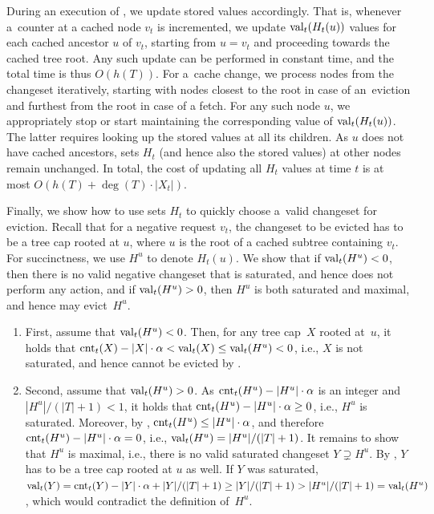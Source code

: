 During an execution of \ALGTC, we update stored values accordingly.
That is, whenever a~counter at a cached node $v_t$ is incremented, we update
$\textrm{val}_t(H_t(u))$ values for each cached ancestor $u$ of $v_t$, starting from
\mbox{$u = v_t$} and proceeding towards the cached tree root. Any such update can be
performed in constant time, and the total time is thus $O(h(T))$. For a~cache
change, we process nodes from the changeset iteratively, starting with nodes
closest to the root in case of an~eviction and furthest from the root in case
of a fetch. For any such node $u$, we appropriately stop or start maintaining
the corresponding value of $\textrm{val}_t(H_t(u))$. The latter requires looking up the
stored values at all its children. As $u$ does not have cached
ancestors, sets $H_t$ (and hence also the stored values) at other nodes 
remain unchanged. In total, the
cost of updating all $H_t$ values at time $t$ is at most $O(h(T) + \deg(T)
\cdot |X_t|)$.

Finally, we show how to use sets $H_t$ to quickly choose a~valid changeset for
eviction. Recall that for a negative request $v_t$, the changeset to be
evicted has to be a tree cap rooted at $u$, where $u$ is the root of a cached subtree
containing $v_t$. For succinctness, we use $H^u$ to denote $H_t(u)$. We show
that if $\textrm{val}_t(H^u) < 0$, then there is no valid negative changeset that is
saturated, and hence \ALGTC does not perform any action, and if $\textrm{val}_t(H^u) >
0$, then $H^u$ is both saturated and maximal, and hence \ALGTC may evict~$H^u$.

\begin{enumerate} 
\item First, assume that $\textrm{val}_t(H^u) < 0$. Then, for any tree cap~$X$ rooted
at~$u$, it holds that $\textrm{cnt}_t(X) - |X| \cdot \alpha < \textrm{val}_t(X) \leq
\textrm{val}_t(H^u) < 0$, i.e., $X$ is not saturated, and hence cannot be evicted by
\ALGTC.

\item Second, assume that $\textrm{val}_t(H^u) > 0$. As $\textrm{cnt}_t(H^u) - |H^u| \cdot
\alpha$ is an integer and $|H^u|/(|T|+1) < 1$, it holds that $\textrm{cnt}_t(H^u) -
|H^u| \cdot \alpha \geq 0$, i.e., $H^u$ is saturated. Moreover, by
, $\textrm{cnt}_t(H^u) \leq |H^u| \cdot
\alpha$, and therefore $\textrm{cnt}_t(H^u) - |H^u| \cdot \alpha = 0$, i.e.,
$\textrm{val}_t(H^u) = |H^u| / (|T|+1)$. It remains to show that $H^u$ is maximal,
i.e., there is no valid saturated changeset $Y \supsetneq H^u$. By
, $Y$ has to be a tree cap
rooted at $u$ as well. If $Y$ was saturated, $\textrm{val}_t(Y) = \textrm{cnt}_t(Y) - |Y|
\cdot \alpha + |Y| / (|T|+1) \geq |Y| / (|T|+1) > |H^u|/(|T|+1) = \textrm{val}_t(H^u)$, 
which would contradict the definition of~$H^u$.
\end{enumerate}

